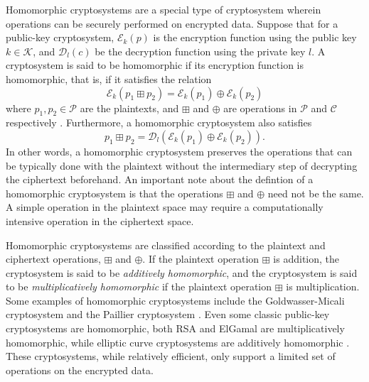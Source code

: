 Homomorphic cryptosystems are a special type of cryptosystem wherein operations can be securely performed on encrypted data. Suppose that for a public-key cryptosystem, $\mathcal{E}_k \left(p \right)$ is the encryption function using the public key $k \in \mathcal{K}$, and $\mathcal{D}_l \left(c \right)$ be the decryption function using the private key $l$. A cryptosystem is said to be homomorphic if its encryption function is homomorphic, that is, if it satisfies the relation
\begin{equation}
    \mathcal{E}_k \left(p_1 \boxplus p_2\right) = \mathcal{E}_k \left(p_1\right) \oplus \mathcal{E}_k \left(p_2\right)
\end{equation}
where $p_1, p_2 \in \mathcal{P}$ are the plaintexts, and $\boxplus$ and $\oplus$ are operations in $\mathcal{P}$ and $\mathcal{C}$ respectively \cite{fontaine_survey_2007}. Furthermore, a homomorphic cryptosystem also satisfies \cite{li_elliptic_2012}
\begin{equation}
    p_1 \boxplus p_2 = \mathcal{D}_l \left( \mathcal{E}_k \left(p_1\right) \oplus \mathcal{E}_k \left(p_2\right) \right).
\end{equation}
In other words, a homomorphic cryptosystem preserves the operations that can be typically done with the plaintext without the intermediary step of decrypting the ciphertext beforehand. An important note about the defintion of a homomorphic cryptosystem is that the operations $\boxplus$ and $\oplus$ need not be the same. A simple operation in the plaintext space may require a computationally intensive operation in the ciphertext space.

Homomorphic cryptosystems are classified according to the plaintext and ciphertext operations, $\boxplus$ and $\oplus$. If the plaintext operation $\boxplus$ is addition, the cryptosystem is said to be \textit{additively homomorphic}, and the cryptosystem is said to be \textit{multiplicatively homomorphic} if the plaintext operation $\boxplus$ is multiplication. Some examples of homomorphic cryptosystems include the Goldwasser-Micali cryptosystem \cite{goldwasser_probabilistic_1984} and the Paillier cryptosystem \cite{stern_public-key_1999}. Even some classic public-key cryptosystems are homomorphic, both RSA and ElGamal are multiplicatively homomorphic, while elliptic curve cryptosystems are additively homomorphic \cite{li_elliptic_2012}. These cryptosystems, while relatively efficient, only support a limited set of operations on the encrypted data.

